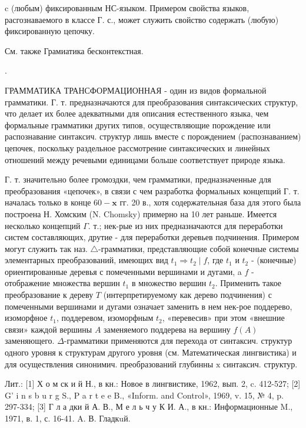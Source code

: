 \documentclass[10pt]{article}
\begin{document}
c (любым) фиксированным НС-языком. Примером свойства языков, расгознаваемого в классе Г. с., может служить свойство содержать (любую) фиксированную цепочку.



См. также Грамиатика бесконтекстная.



.



ГРАММАТИКА ТРАНСФОРМАЦИОННАЯ - один из видов формальной грамматики. Г. т. предназначаются для преобразования синтаксических структур, что делает их более адекватными для описания естественного языка, чем формальные грамматики других типов, осуществляющие порождение или распознавание синтаксич. структур лишь вместе с порождением (распознаванием) цепочек, поскольку раздельное рассмотрение синтаксических и линейных отношений между речевыми единицами больше соответствует природе языка.



Г. т. значительно более громоздки, чем грамматики, предназначенные для преобразования «цепочек», в связи с чем разработка формальных концепций $Г$. т. началась только в конце $60-\mathbf{x}$ гг. 20 в., хотя содержательная база для этого была построена Н. Хомским (N. Chomsky) примерно на 10 лет раньше. Имеется несколько концепций $\Gamma$. т.; нек-рые из них предназначаются для переработки систем составляющих, друтие - для переработки деревьев подчинения. Примером могут служить так наз. $\triangle$-грамматики, представляющие собой конечные системы элементарных преобразований, имеющих вид $t_{1} \Rightarrow t_{2} \mid f$, где $t_{1}$ и $t_{2}$ - (конечные) ориентированные деревья с помеченными вершинами и дугами, a $f$ - отображение множества вершин $t_{1}$ в множество вершин $t_{2}$. Применить такое преобразование к дереву $T$ (интерпретируемому как дерево подчинения) с помеченными вершинами и дугами означает заменить в нем нек-рое поддерево, изоморфное $t_{1}$, поддеревом, изоморфным $t_{2}$, «перевесив» при этом «внешние связи» каждой вершины $A$ заменяемого поддерева на вершину $f(A)$ заменяющего. $\Delta$-грамматики применяются для перехода от синтаксич. структур одного уровня к структурам другого уровня (см. Математическая лингвистика) и для осуществления синонимич. преобразований глубинны $\mathrm{x}$ синтаксич. структур.



Лит.: [1] Х о м ск и й Н., в кн.: Новое в лингвистике, 1962, вып. 2, c. 412-527; [2] G' i n s b u r g S., P a r t e e B., «Inform. and Control», 1969, v. 15, № 4, p. 297-334; [3] Г л а дки й А. В., М е л ь ч у К И. А., в кн.: Информационные M., 1971, в. 1, с. 16-41. A. В. Гладкuй.
\end{document}

